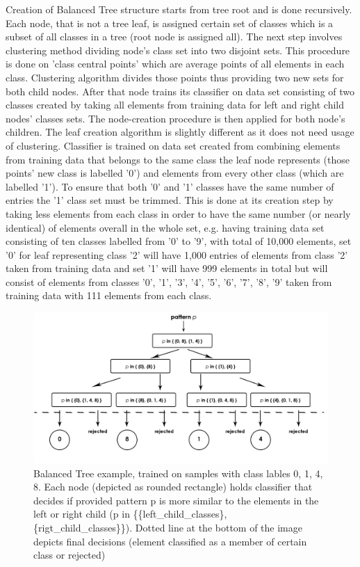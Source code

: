 Creation of Balanced Tree structure starts from tree root and is done recursively. Each node, that is not a tree leaf, is assigned certain set of classes which is a subset of all classes in a tree (root node is assigned all). The next step involves clustering method dividing node's class set into two disjoint sets. This procedure is done on 'class central points' which are average points of all elements in each class. Clustering algorithm divides those points thus providing two new sets for both child nodes. After that node trains its classifier on data set consisting of two classes created by taking all elements from training data for left and right child nodes' classes sets. The node-creation procedure is then applied for both node's children. The leaf creation algorithm is slightly different as it does not need usage of clustering. Classifier is trained on data set created from combining elements from training data that belongs to the same class the leaf node represents (those points' new class is labelled '0') and elements from every other class (which are labelled '1')\label{balanced_tree:one-vs-rest}. To ensure that both '0' and '1' classes have the same number of entries the '1' class set must be trimmed. This is done at its creation step by taking less elements from each class in order to have the same number (or nearly identical) of elements overall in the whole set, e.g. having training data set consisting of ten classes labelled from '0' to '9', with total of 10,000 elements, set '0' for leaf representing class '2' will have 1,000 entries of elements from class '2' taken from training data and set '1' will have 999 elements in total but will consist of elements from classes '0', '1', '3', '4', '5', '6', '7', '8', '9' taken from training data with 111 elements from each class.

\begin{figure}[!t]
	\centering
	\includegraphics[width=1\textwidth]{Figures/balanced_tree.jpg}
	\caption{Balanced Tree example, trained on samples with class lables 0, 1, 4, 8. Each node (depicted as rounded rectangle) holds classifier that decides if provided pattern p is more similar to the elements in the left or right child (p in \{\{left\_child\_classes\}, \{rigt\_child\_classes\}\}). Dotted line at the bottom of the image depicts final decisions (element classified as a member of certain class or rejected)}
	\label{fig:rejection_version1}\vspace{-3pt}
\end{figure}

